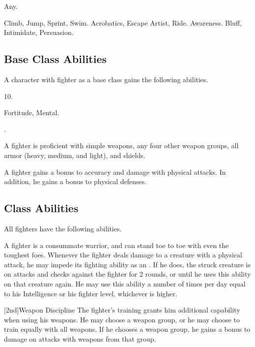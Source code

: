      Any.

     Climb, Jump, Sprint, Swim.
     Acrobatics, Escape Artist, Ride.
     Awareness.
     Bluff, Intimidate, Persuasion.

    \subsection{Base Class Abilities}
        A character with fighter as a base class gains the following abilities.

         10.

          Fortitude,  Mental.

         .

        A fighter is proficient with simple weapons, any four other weapon groups,  all armor (heavy, medium, and light), and shields.

        A fighter gains a  bonus to accuracy and damage with physical attacks.
        In addition, he gains a  bonus to physical defenses.

    \subsection{Class Abilities}
        All fighters have the following abilities.

        A fighter is a consummate warrior, and can stand toe to toe with even the toughest foes.
        Whenever the fighter deals damage to a creature with a physical attack, he may impede its fighting ability as an .
        If he does, the struck creature is \impaired on attacks and checks against the fighter for 2 rounds, or until he uses this ability on that creature again.
        He may use this ability a number of times per day equal to his Intelligence or his fighter level, whichever is higher.

        [2nd]{Weapon Discipline}
        The fighter's training grants him additional capability when using his weapons.
        He may choose a weapon group, or he may choose to train equally with all weapons.
        If he chooses a weapon group, he gains a  bonus to damage on attacks with weapons from that group.

